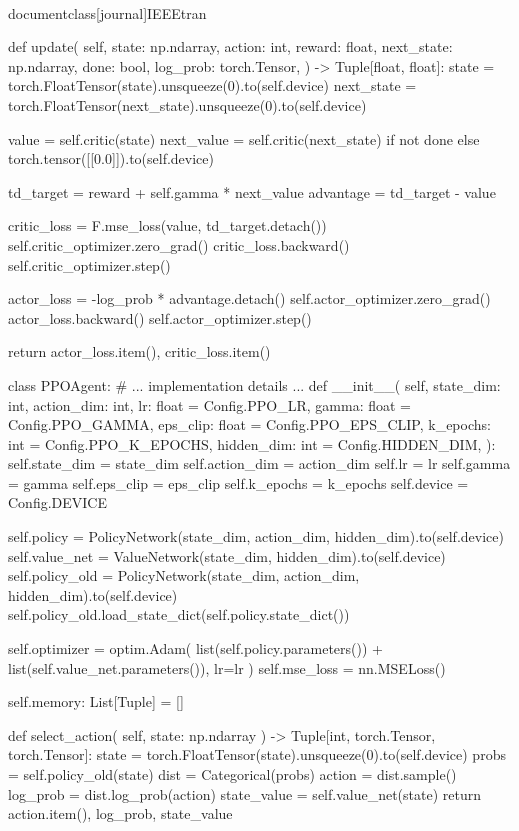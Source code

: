 \\documentclass[journal]{IEEEtran}
\begin{document}
    def update(
        self,
        state: np.ndarray,
        action: int,
        reward: float,
        next_state: np.ndarray,
        done: bool,
        log_prob: torch.Tensor,
    ) -> Tuple[float, float]:
        state = torch.FloatTensor(state).unsqueeze(0).to(self.device)
        next_state = torch.FloatTensor(next_state).unsqueeze(0).to(self.device)

        value = self.critic(state)
        next_value = self.critic(next_state) if not done else torch.tensor([[0.0]]).to(self.device)

        td_target = reward + self.gamma * next_value
        advantage = td_target - value

        critic_loss = F.mse_loss(value, td_target.detach())
        self.critic_optimizer.zero_grad()
        critic_loss.backward()
        self.critic_optimizer.step()

        actor_loss = -log_prob * advantage.detach()
        self.actor_optimizer.zero_grad()
        actor_loss.backward()
        self.actor_optimizer.step()

        return actor_loss.item(), critic_loss.item()


class PPOAgent:
    # ... implementation details ...
    def __init__(
        self,
        state_dim: int,
        action_dim: int,
        lr: float = Config.PPO_LR,
        gamma: float = Config.PPO_GAMMA,
        eps_clip: float = Config.PPO_EPS_CLIP,
        k_epochs: int = Config.PPO_K_EPOCHS,
        hidden_dim: int = Config.HIDDEN_DIM,
    ):
        self.state_dim = state_dim
        self.action_dim = action_dim
        self.lr = lr
        self.gamma = gamma
        self.eps_clip = eps_clip
        self.k_epochs = k_epochs
        self.device = Config.DEVICE

        self.policy = PolicyNetwork(state_dim, action_dim, hidden_dim).to(self.device)
        self.value_net = ValueNetwork(state_dim, hidden_dim).to(self.device)
        self.policy_old = PolicyNetwork(state_dim, action_dim, hidden_dim).to(self.device)
        self.policy_old.load_state_dict(self.policy.state_dict())

        self.optimizer = optim.Adam(
            list(self.policy.parameters()) + list(self.value_net.parameters()), lr=lr
        )
        self.mse_loss = nn.MSELoss()

        self.memory: List[Tuple] = []

    def select_action(
        self, state: np.ndarray
    ) -> Tuple[int, torch.Tensor, torch.Tensor]:
        state = torch.FloatTensor(state).unsqueeze(0).to(self.device)
        probs = self.policy_old(state)
        dist = Categorical(probs)
        action = dist.sample()
        log_prob = dist.log_prob(action)
        state_value = self.value_net(state)
        return action.item(), log_prob, state_value
\end{document}
